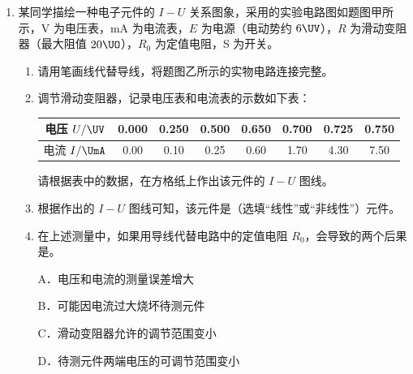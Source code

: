 \documentclass[\gkver]{gaokaozhenti}
\begin{document}
\begin{enumerate}
{B．由于 O 点的电势为 0，根据匀强电场的对称性 $\varphi_{A}=-\varphi_{B}$，又 $q_{A}=-q_{B}$，$E_{p}=q\varphi$，所以 $E_{pA}=E_{pB}$，B 正确；

CD．A、B 位置的小球受到的静电力分别水平向右、水平向左，绝缘轻杆逆时针旋转，两小球静电力对两小球均做正功，电场力做正功，电势能减少，CD 错误。

故选 AB。
}

\item
某同学描绘一种电子元件的 $I-U$ 关系图象，采用的实验电路图如题图甲所示，V 为电压表，mA 为电流表，$E$ 为电源（电动势约 $6\UV$），$R$ 为滑动变阻器（最大阻值 $20\UO$），$R_{0}$ 为定值电阻，S 为开关。


\begin{enumerate}
\item
请用笔画线代替导线，将题图乙所示的实物电路连接完整\tkanswer[3cm]{}。
\item
调节滑动变阻器，记录电压表和电流表的示数如下表：

\begin{center}
\begin{tabular}{|c|c|c|c|c|c|c|c|}
\hline
电压 $U/\UV$ & 0.000 & 0.250 & 0.500 & 0.650 & 0.700 & 0.725 & 0.750 \\
\hline
电流 $I/\UmA$ & 0.00 & 0.10 & 0.25 & 0.60 & 1.70 & 4.30 & 7.50 \\
\hline
\end{tabular}
\end{center}

请根据表中的数据，在方格纸上作出该元件的 $I-U$ 图线\tkanswer[3cm]{}。

\item
根据作出的 $I-U$ 图线可知，该元件是（选填“线性”或“非线性”）元件。
\item
在上述测量中，如果用导线代替电路中的定值电阻 $R_{0}$，会导致的两个后果是。

A．电压和电流的测量误差增大

B．可能因电流过大烧坏待测元件

C．滑动变阻器允许的调节范围变小

D．待测元件两端电压的可调节范围变小
\end{enumerate}


\end{enumerate}
\end{document}
